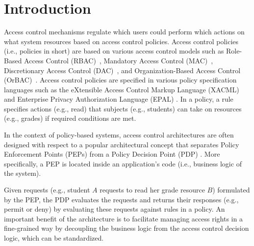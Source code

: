 \section{Introduction} \label{sec:introduction}

Access control mechanisms regulate which users
could perform which actions on what system resources based on access control policies.
Access control policies (i.e., policies in short) are based on various access control models such as Role-Based Access Control (RBAC)~\cite{ferraiolo:rbac}, Mandatory Access Control (MAC)~\cite{mac}, Discretionary Access Control (DAC)~\cite{dac}, and Organization-Based Access Control (OrBAC)~\cite{orbac}.
Access control policies are specified in various policy specification languages such
as the eXtensible Access Control Markup Language (XACML) \cite{sunxacml}
and Enterprise Privacy Authorization Language (EPAL) \cite{epal}.
In a policy, a rule specifies actions (e.g., read) that subjects (e.g., students) can take on resources (e.g., grades) if required conditions are met.


 
In the context of policy-based systems,
access control architectures are often designed with respect to a popular
architectural concept that separates Policy Enforcement Points (PEPs) from a Policy Decision Point (PDP) \cite{separation}. More specifically, a PEP is located inside an application's code (i.e., business logic of the system).

Given requests (e.g., student $A$ requests to read her grade resource $B$) formulated by the PEP, the PDP evaluates the requests and returns their responses (e.g., permit or deny) by evaluating these requests 
against rules in a policy. 
An important benefit of the architecture is to facilitate managing access rights in a fine-grained way by 
decoupling the business logic from the access control decision logic, which can be standardized.


